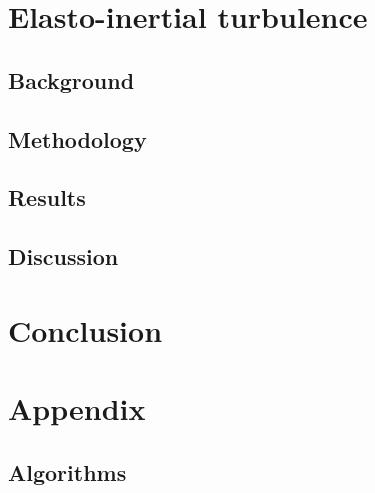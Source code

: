 \documentclass[12pt]{report} %
\begin{document}
\chapter{Elasto-inertial turbulence}

\section{Background}

\section{Methodology}

\section{Results}

\section{Discussion}

\chapter{Conclusion}


\chapter{Appendix}

\section{Algorithms}
\end{document}
